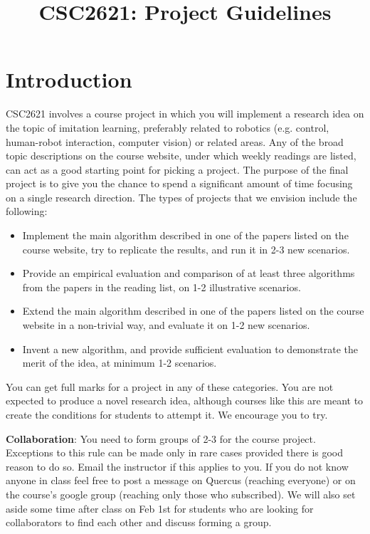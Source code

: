 \documentclass[a4paper,10pt]{article}
\title{CSC2621: Project Guidelines}
\author{}
\date{}
\begin{document}
\maketitle


\section{Introduction}
CSC2621 involves a course project in which you will implement a research idea on the topic of imitation learning, preferably related to robotics (e.g. control, human-robot interaction, computer vision) 
or related areas. Any of the broad topic descriptions on the course website, under which weekly readings are listed, can act as a good starting point for picking a project. The purpose of the final project
is to give you the chance to spend a significant amount of time focusing on a single research direction. The types of projects that we envision include the following:

\begin{itemize}
 \item Implement the main algorithm described in one of the papers listed on the course website, try to replicate the results, and run it in 2-3 new scenarios.
 \item Provide an empirical evaluation and comparison of at least three algorithms from the papers in the reading list, on 1-2 illustrative scenarios.
 \item Extend the main algorithm described in one of the papers listed on the course website in a non-trivial way, and evaluate it on 1-2 new scenarios.
 \item Invent a new algorithm, and provide sufficient evaluation to demonstrate the merit of the idea, at minimum 1-2 scenarios.
\end{itemize}

\noindent You can get full marks for a project in any of these categories. You are not expected to produce a novel research idea, although courses like this are meant to 
create the conditions for students to attempt it. We encourage you to try.  
\newline


\noindent \textbf{Collaboration}: You need to form groups of 2-3 for the course project. Exceptions to this rule can be made only in rare cases provided there is good reason to do so. 
Email the instructor if this applies to you. If you do not know anyone in class feel free to post a message on Quercus (reaching everyone) or on the course's google group (reaching only 
those who subscribed). We will also set aside some time after class on Feb 1st for students who are looking for collaborators to find each other and discuss forming a group.
\end{document}
